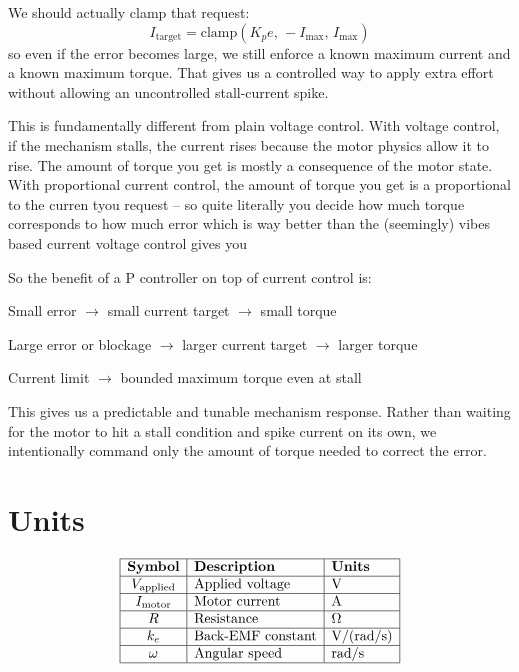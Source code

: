 \documentclass[12pt]{article}
\begin{document}
\par We should actually clamp that request:
\[
I_{\text{target}} = \text{clamp}(K_p e,\,-I_{\max},\,I_{\max})
\]
so even if the error becomes large, we still enforce a known maximum current and a known maximum torque. That gives us a controlled way to apply extra effort without allowing an uncontrolled stall-current spike.

\par This is fundamentally different from plain voltage control. With voltage control, if the mechanism stalls, the current rises because the motor physics allow it to rise. The amount of torque you get is mostly a consequence of the motor state. With proportional current control, the amount of torque you get is a proportional to the curren tyou request -- so quite literally you decide how much torque corresponds to how much error which is way better than the (seemingly) vibes based current voltage control gives you

\par So the benefit of a P controller on top of current control is:
\par Small error $\rightarrow$ small current target $\rightarrow$ small torque
\par Large error or blockage $\rightarrow$ larger current target $\rightarrow$ larger torque
\par Current limit $\rightarrow$ bounded maximum torque even at stall

\par This gives us a predictable and tunable mechanism response. Rather than waiting for the motor to hit a stall condition and spike current on its own, we intentionally command only the amount of torque needed to correct the error.

\section*{Units}
\[
\begin{array}{|>{\displaystyle}c|l|l|}
\hline
\textbf{Symbol} & \textbf{Description} & \textbf{Units} \\
\hline
V_{\text{applied}} & \text{Applied voltage} & \text{V} \\
\hline
I_{\text{motor}} & \text{Motor current} & \text{A} \\
\hline
R & \text{Resistance} & \Omega \\
\hline
k_e & \text{Back-EMF constant} & \text{V}/(\text{rad}/\text{s}) \\
\hline
\omega & \text{Angular speed} & \text{rad}/\text{s} \\
\hline
\end{array}
\]
\end{document}
